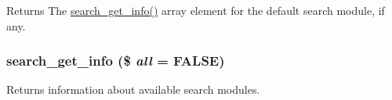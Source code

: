 \begin{DoxyReturn}{Returns}
The \hyperlink{search_8module_aa36af44ad9f887b93fdfcf33daa9cb1e}{search\_\-get\_\-info()} array element for the default search module, if any. 
\end{DoxyReturn}
\hypertarget{search_8module_aa36af44ad9f887b93fdfcf33daa9cb1e}{
\subsubsection[{search\_\-get\_\-info}]{\setlength{\rightskip}{0pt plus 5cm}search\_\-get\_\-info (\$ {\em all} = {\ttfamily FALSE})}}
\label{search_8module_aa36af44ad9f887b93fdfcf33daa9cb1e}
Returns information about available search modules.



